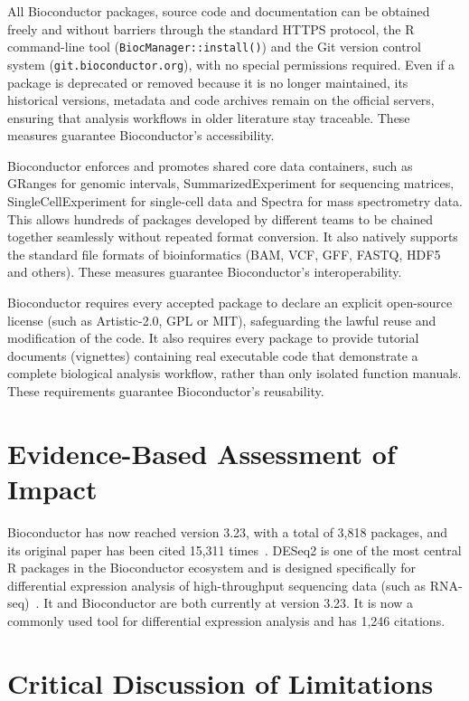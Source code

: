 \documentclass{article}
\begin{document}
All Bioconductor packages, source code and documentation can be obtained freely and without barriers through the standard HTTPS protocol, the R command-line tool (\texttt{BiocManager::install()}) and the Git version control system (\texttt{git.bioconductor.org}), with no special permissions required. Even if a package is deprecated or removed because it is no longer maintained, its historical versions, metadata and code archives remain on the official servers, ensuring that analysis workflows in older literature stay traceable. These measures guarantee Bioconductor's accessibility.

Bioconductor enforces and promotes shared core data containers, such as GRanges for genomic intervals, SummarizedExperiment for sequencing matrices, SingleCellExperiment for single-cell data and Spectra for mass spectrometry data. This allows hundreds of packages developed by different teams to be chained together seamlessly without repeated format conversion. It also natively supports the standard file formats of bioinformatics (BAM, VCF, GFF, FASTQ, HDF5 and others). These measures guarantee Bioconductor's interoperability.

Bioconductor requires every accepted package to declare an explicit open-source license (such as Artistic-2.0, GPL or MIT), safeguarding the lawful reuse and modification of the code. It also requires every package to provide tutorial documents (vignettes) containing real executable code that demonstrate a complete biological analysis workflow, rather than only isolated function manuals. These requirements guarantee Bioconductor's reusability.

\section{Evidence-Based Assessment of Impact}

Bioconductor has now reached version 3.23, with a total of 3,818 packages, and its original paper has been cited 15,311 times~\cite{gentleman2004,biocsite}. DESeq2 is one of the most central R packages in the Bioconductor ecosystem and is designed specifically for differential expression analysis of high-throughput sequencing data (such as RNA-seq)~\cite{love2014}. It and Bioconductor are both currently at version 3.23. It is now a commonly used tool for differential expression analysis and has 1,246 citations.

\section{Critical Discussion of Limitations}
\end{document}
